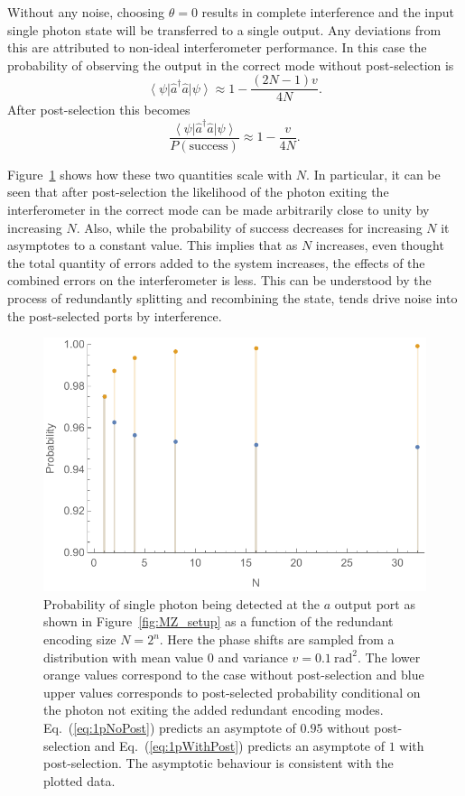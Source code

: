 \documentclass[aps,pra,twocolumn,superscriptaddress,numerical,floatfix]{revtex4-1}
\begin{document}
Without any noise, choosing $\theta=0$ results in complete interference and the input single photon state will be transferred to a single output.  Any deviations from this are attributed to non-ideal interferometer performance. 
In this case the probability of observing the output in the correct mode without post-selection is
\begin{equation}
	\left\langle \psi\right|\hat{a}^{\dagger}\hat{a}\left|\psi\right\rangle \approx 1 - \frac{(2N-1)v}{4N}. \label{eq:1pNoPost}
\end{equation}
After post-selection this becomes
\begin{equation}
	\frac{\left\langle \psi\right|\hat{a}^{\dagger}\hat{a}\left|\psi\right\rangle}{P(\textrm{success})} \approx 1 - \frac{v}{4N}. \label{eq:1pWithPost}
\end{equation}
		
Figure~\ref{fig:post vs no post} shows how these two quantities scale with $N$. In particular, it can be seen that after post-selection the likelihood of the photon exiting the interferometer in the correct mode can be made arbitrarily close to unity by increasing $N$. Also, while the probability of success decreases for increasing $N$ it asymptotes to a constant value. This implies that as $N$ increases, even thought the total quantity of errors added to the system increases, the effects of the combined errors on the interferometer is less. This can be understood by the process of redundantly splitting and recombining the state, tends drive noise into the post-selected ports by interference.  
\begin{figure}[tbh]
	\includegraphics[width=\columnwidth]{1photonpostvsnopost.pdf}
	\caption{\label{fig:post vs no post} Probability of single photon being detected at the $a$ output port as shown in Figure~\ref{fig:MZ_setup} as a function of the redundant encoding size $N=2^n$. Here the phase shifts are sampled from a distribution with mean value $0$ and variance $v=0.1\ \textrm{rad}^{2}$. The lower orange values correspond to the case without post-selection and blue upper values corresponds to post-selected probability conditional on the photon not exiting the added redundant encoding modes.  Eq.~(\ref{eq:1pNoPost}) predicts an asymptote of $0.95$ without post-selection and Eq.~(\ref{eq:1pWithPost}) predicts an asymptote of $1$ with post-selection.  The asymptotic behaviour is consistent with the plotted data.}
\end{figure}
\end{document}
